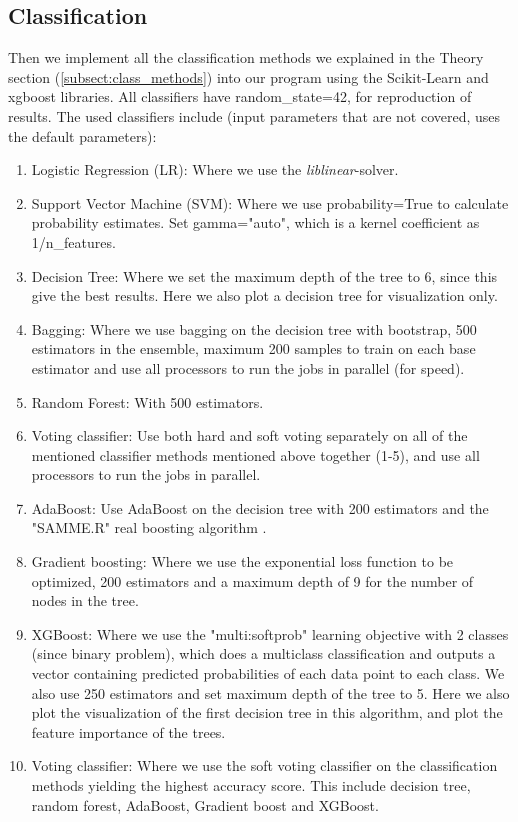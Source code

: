 \documentclass[12pt,a4paper,english]{article}
\begin{document}
\subsection{Classification}
\label{subsect:classif}
Then we implement all the classification methods we explained in the Theory section (\ref{subsect:class_methods}) into our program using the Scikit-Learn and xgboost libraries. All classifiers have random\_state=42, for reproduction of results. The used classifiers include (input parameters that are not covered, uses the default parameters):
\begin{enumerate}
	\item Logistic Regression (LR): Where we use the \textit{liblinear}-solver.
	\item Support Vector Machine (SVM): Where we use probability=True to calculate probability estimates. Set gamma="auto", which is a kernel coefficient as 1/n\_features.
	\item Decision Tree: Where we set the maximum depth of the tree to 6, since this give the best results. Here we also plot a decision tree for visualization only.
	\item Bagging: Where we use bagging on the decision tree with bootstrap, 500 estimators in the ensemble, maximum 200 samples to train on each base estimator and use all processors to run the jobs in parallel (for speed).
	\item Random Forest: With 500 estimators.
	\item Voting classifier: Use both hard and soft voting separately on all of the mentioned classifier methods mentioned above together (1-5), and use all processors to run the jobs in parallel.
	\item AdaBoost: Use AdaBoost on the decision tree with 200 estimators and the "SAMME.R" real boosting algorithm \citep{SAMMER}.
	\item Gradient boosting: Where we use the exponential loss function to be optimized, 200 estimators and a maximum depth of 9 for the number of nodes in the tree.
	\item XGBoost: Where we use the "multi:softprob" learning objective with 2 classes (since binary problem), which does a multiclass classification and outputs a vector containing predicted probabilities of each data point to each class. We also use 250 estimators and set maximum depth of the tree to 5. Here we also plot the visualization of the first decision tree in this algorithm, and plot the feature importance of the trees.
	\item Voting classifier: Where we use the soft voting classifier on the classification methods yielding the highest accuracy score. This include decision tree, random forest, AdaBoost, Gradient boost and XGBoost.
\end{enumerate}
\end{document}
